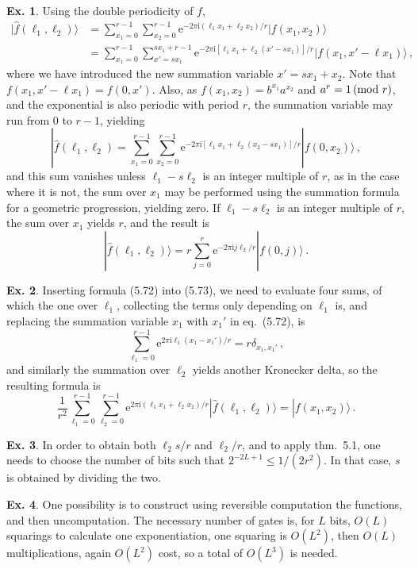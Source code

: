 \documentclass[a4paper,12pt]{article}
\def\e{\mathrm{e}}
\def\imagi{\mathrm{i}}
\theoremstyle{definition}
\newtheorem{exercise}{Ex.}[section]
\begin{document}
\begin{exercise}
 Using the double periodicity of $f$,
 \[
  \begin{aligned}
   |\hat{f}(\ell_1, \ell_2)\rangle &= \sum_{x_1=0}^{r-1}\sum_{x_2=0}^{r-1} \e^{-2\pi\imagi (\ell_1 x_1 + \ell_2 x_2)/r} |f(x_1, x_2)\rangle\\ &= \sum_{x_1=0}^{r-1}\sum_{x'=sx_1}^{sx_1 + r - 1}\e^{-2\pi\imagi [\ell_1 x_1 + \ell_2(x'-sx_1)]/r}|f(x_1, x'-\ell x_1)\rangle\,,
  \end{aligned}
 \]
 where we have introduced the new summation variable $x'=s x_1+x_2$. Note that $f(x_1,x'-\ell x_1)=f(0, x')$. Also, as $f(x_1, x_2)=b^{x_1}a^{x_2}$ and $a^r=1\,({\rm mod\ }r)$, and the exponential is also periodic with period $r$, the summation variable may run from 0 to $r-1$, yielding
 \[
   |\hat{f}(\ell_1, \ell_2) = \sum_{x_1=0}^{r-1}\sum_{x_2=0}^{r-1}\e^{-2\pi\imagi[\ell_1 x_1 + \ell_2(x_2-s x_1)]/r}|f(0, x_2)\rangle\,,
 \]
 and this sum vanishes unless $\ell_1-s\ell_2$ is an integer multiple of $r$, as in the case where it is not, the sum over $x_1$ may be performed using the summation formula for a geometric progression, yielding zero. If $\ell_1 -s\ell_2$ is an integer multiple of $r$, the sum over $x_1$ yields $r$, and the result is
 \[
  |\hat{f}(\ell_1, \ell_2)\rangle = r\sum_{j=0}^r \e^{-2\pi\imagi j\ell_2/r}|f(0, j)\rangle\,.
 \]
\end{exercise}

\begin{exercise}
 Inserting formula (5.72) into (5.73), we need to evaluate four sums, of which the one over $\ell_1$, collecting the terms only depending on $\ell_1$ is, and replacing the summation variable $x_1$ with $x_1'$ in eq.\ (5.72), is
 \[
  \sum_{\ell_1=0}^{r-1}\e^{2\pi\imagi \ell_1(x_1-x_1')/r} = r\delta_{x_1,x_1'}\,,
 \]
 and similarly the summation over $\ell_2$ yields another Kronecker delta, so the resulting formula is
 \[
  \frac{1}{r^2}\sum_{\ell_1=0}^{r-1}\sum_{\ell_2=0}^{r-1}\e^{2\pi\imagi(\ell_1 x_1 + \ell_2 x_2)/r}|\hat{f}(\ell_1, \ell_2)\rangle = |f(x_1, x_2)\rangle\,.
 \]
\end{exercise}

\begin{exercise}
 In order to obtain both $\ell_2 s/r$ and $\ell_2/r$, and to apply thm.~5.1, one needs to choose the number of bits such that $2^{-2L+1}\le 1/(2r^2)$. In that case, $s$ is obtained by dividing the two.
\end{exercise}

\begin{exercise}
 One possibility is to construct using reversible computation the functions, and then uncomputation. The necessary number of gates is, for $L$ bits, $O(L)$ squarings to calculate one exponentiation, one squaring is $O(L^2)$, then $O(L)$ multiplications, again $O(L^2)$ cost, so a total of $O(L^3)$ is needed. 
\end{exercise}
\end{document}

